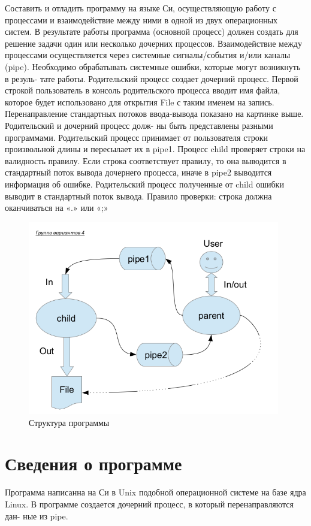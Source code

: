 \documentclass[pdf, unicode, 12pt, a4paper,oneside,fleqn]{article}
\begin{document}
Составить и отладить программу на языке Си, осуществляющую работу с процессами
и взаимодействие между ними в одной из двух операционных систем. В результате
работы программа (основной процесс) должен создать для решение задачи один или
несколько дочерних процессов. Взаимодействие между процессами осуществляется
через системные сигналы/события и/или каналы (pipe).
Необходимо обрабатывать системные ошибки, которые могут возникнуть в резуль-
тате работы.
Родительский процесс создает дочерний процесс. Первой строкой пользователь в
консоль родительского процесса вводит имя файла, которое будет использовано для
открытия File с таким именем на запись. Перенаправление стандартных потоков
ввода-вывода показано на картинке выше. Родительский и дочерний процесс долж-
ны быть представлены разными программами. Родительский процесс принимает от
пользователя строки произвольной длины и пересылает их в pipe1.
Процесс child проверяет строки на валидность правилу. Если строка соответствует
правилу, то она выводится в стандартный поток вывода дочернего процесса, иначе в
pipe2 выводится информация об ошибке. Родительский процесс полученные от child
ошибки выводит в стандартный поток вывода.
Правило проверки: строка должна оканчиваться на «.» или «;»

\begin{figure}[htp]
    \centering
    \includegraphics[width=11cm]{os2.png}
    \caption{Структура программы}
    \label{fig:os2}
\end{figure}

\section{Сведения о программе}

Программа написанна на Си в Unix подобной операционной системе на базе ядра
Linux. В программе создается дочерний процесс, в который перенаправляются дан-
ные из pipe.
\end{document}

